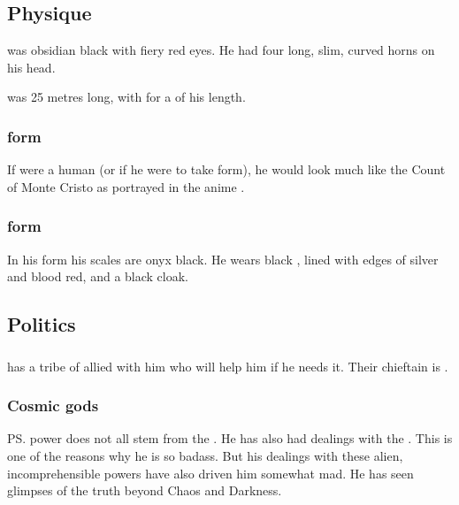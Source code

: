 \subsection{Physique}
\Ishnaruchaefir{} was obsidian black with fiery red eyes. 
He had four long, slim, curved horns on his head. 

\Ishnaruchaefir was 25 metres long, with  for a \dragon of his length. 





\subsubsection{\Human{} form}
If \Ishnaruchaefir{} were a human (or if he were to take \human{} form), he would look much like the Count of Monte Cristo as portrayed in the anime \cite{Anime:Gankutsuou}. 





\subsubsection{\Scathaese{} form}
In his \scathaese{} form his scales are onyx black. 
He wears black \armour, lined with edges of silver and blood red, and a black cloak. 









\subsection{Politics}





\subsubsection{\Baelzerach}
\Ishnaruchaefir{} has a tribe of \Baelzerach{} \resphain{} allied with him who will help him if he needs it. 
Their chieftain is . 





\subsubsection{Cosmic gods}
\ps{\Ishnaruchaefir} power does not all stem from the \xss{}. He has also had dealings with the . This is one of the reasons why he is so badass. But his dealings with these alien, incomprehensible powers have also driven him somewhat mad. He has seen glimpses of the truth beyond Chaos and Darkness. 


